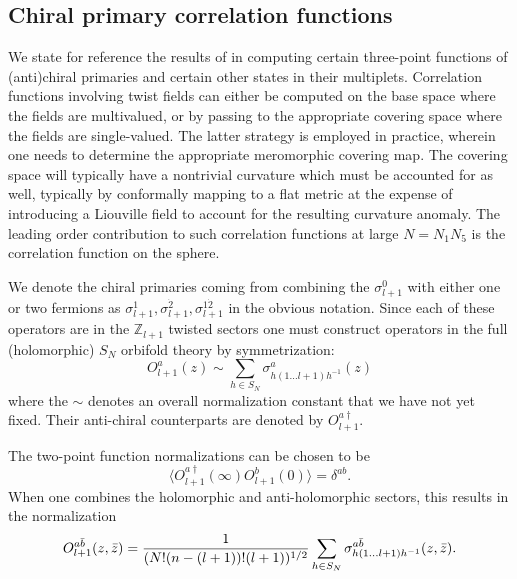 \documentclass[11pt]{amsart}
\theoremstyle{thm}
\numberwithin{equation}{subsection}
\theoremstyle{def}
\theoremstyle{rem}
\begin{document}
\subsection{Chiral primary correlation functions} We state for reference the results of \cite{LuninMathur, Ramgoolametal} in computing certain three-point functions of (anti)chiral primaries and certain other states in their multiplets. Correlation functions involving twist fields can either be computed on the base space where the fields are multivalued, or by passing to the appropriate covering space where the fields are single-valued. The latter strategy is employed in practice, wherein one needs to determine the appropriate meromorphic covering map. The covering space will typically have a nontrivial curvature which must be accounted for as well, typically by conformally mapping to a flat metric at the expense of introducing a Liouville field to account for the resulting curvature anomaly. The leading order contribution to such correlation functions at large $N=N_1N_5$ is the correlation function on the sphere. 

We denote the chiral primaries coming from combining the $\sigma^0_{l+1}$ with either one or two fermions as $\sigma^1_{l+1}, \sigma^{\dot{2}}_{l+1}, \sigma^{1\dot{2}}_{l+1}$ in the obvious notation. Since each of these operators are in the $\mathbb{Z}_{l+1}$ twisted sectors one must construct operators in the full (holomorphic) $S_N$ orbifold theory by symmetrization: 
\begin{equation}
O^a_{l+1}(z) \sim \sum_{h \in S_N}\sigma^a_{h(1\ldots l+1) h^{-1}}(z) 
\end{equation} where the $\sim$ denotes an overall normalization constant that we have not yet fixed. 
Their anti-chiral counterparts are denoted by $O^{a \dagger}_{l+1}$. 

The two-point function normalizations can be chosen to be 
\begin{equation}
\langle O^{a \dagger}_{l+1}(\infty) O^{b}_{l+1}(0) \rangle = \delta^{ab}.
\end{equation}  When one combines the holomorphic and anti-holomorphic sectors, this results in the normalization
\begin{equation}
O^{a \bar{b}}_{l+1}(z, \bar{z}) = {1 \over (N! (n-(l+1))! (l+1))^{1/2}} \sum_{h \in S_N}\sigma^{a \bar{b}}_{h(1\ldots l+1) h^{-1}}(z, \bar{z}). 
\end{equation}
\end{document}
